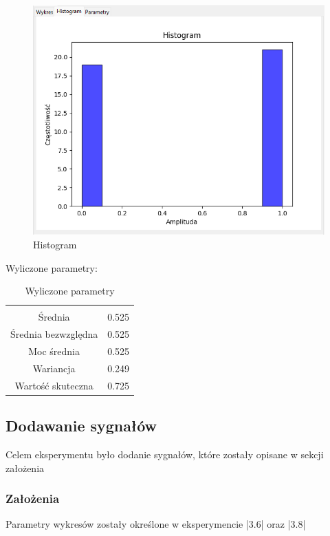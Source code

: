 \documentclass{article}
\begin{document}
\begin{figure}[h!]
    \centering
    \includegraphics[width=\textwidth]{img/szum-impuls/hist.png}
    \caption{Histogram}
\end{figure}
\FloatBarrier
Wyliczone parametry:
\begin{table}[h!]
    \centering
    \vspace{0.2cm}
    \begin{tabular}{|c|c|}
        \hline\hline\\[-0.4cm]
        Średnia & 0.525  \\
        \hline
        Średnia bezwzględna & 0.525  \\
        \hline
        Moc średnia & 0.525  \\
        \hline
        Wariancja & 0.249 \\
        \hline
        Wartość skuteczna & 0.725 \\
        \hline
    \end{tabular}
    \caption{Wyliczone parametry}
    \label{szumimpuls}
\end{table}  

\subsection{Dodawanie sygnałów} \label{add} 
Celem eksperymentu było dodanie sygnałów, które zostały opisane w sekcji założenia

\subsubsection{Założenia} 
    Parametry wykresów zostały określone w eksperymencie |3.6| oraz |3.8|
\end{document}
